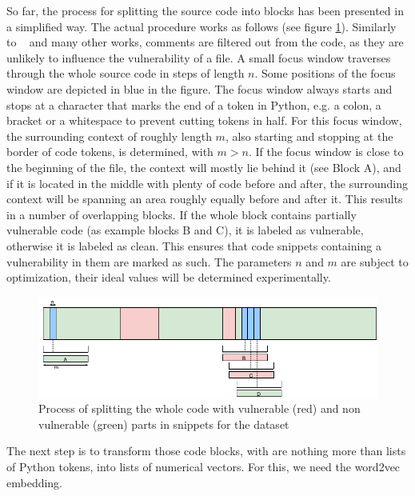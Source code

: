 \documentclass[
a4paper,
pagesize,
pdftex,
12pt,
twoside, %
BCOR=5mm, %
ngerman,
fleqn,
final,
]{scrartcl}
\begin{document}
	So far, the process for splitting the source code into blocks has been presented in a simplified way. The actual procedure works as follows (see figure \ref{fig:FocusBlocks}).
	Similarly to ~\cite{Hovsepyan.2012} and many other works, comments are filtered out from the code, as they are unlikely to influence the vulnerability of a file. A small focus window traverses through the whole source code in steps of length $n$. Some positions of the focus window are depicted in blue in the figure. The focus window always starts and stops at a character that marks the end of a token in Python, e.g. a colon, a bracket or a whitespace to prevent cutting tokens in half. For this focus window, the surrounding context of roughly length $m$, also starting and stopping at the border of code tokens, is determined, with $m > n$. If the focus window is close to the beginning of the file, the context will mostly lie behind it (see Block A), and if it is located in the middle with plenty of code before and after, the surrounding context will be spanning an area roughly equally before and after it. This results in a number of overlapping blocks. If the whole block contains partially vulnerable code (as example blocks B and C), it is labeled as vulnerable, otherwise it is labeled as clean. This ensures that code snippets containing a vulnerability in them are marked as such. The parameters $n$ and $m$ are subject to optimization, their ideal values will be determined experimentally.
	
	\begin{figure}[ht]
		\centering
		\includegraphics[width=0.9\linewidth]{img/FocusBlocks}
		\caption{Process of splitting the whole code with vulnerable (red) and non vulnerable (green) parts in snippets for the dataset}
		\label{fig:FocusBlocks}
	\end{figure}
	
	The next step is to transform those code blocks, with are nothing more than lists of Python tokens, into lists of numerical vectors. For this, we need the word2vec embedding. 
	
\end{document}

